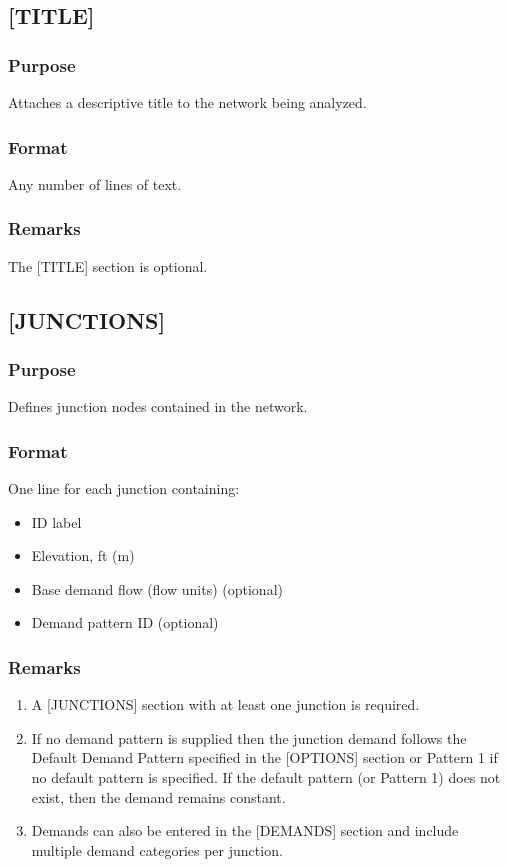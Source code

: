 \subsection{[TITLE]}
  \subsubsection{Purpose}
  Attaches a descriptive title to the network being analyzed.
  \subsubsection{Format}
  Any number of lines of text.
  \subsubsection{Remarks}
  The [TITLE] section is optional.
\subsection{[JUNCTIONS]}
  \subsubsection{Purpose}
  Defines junction nodes contained in the network.
  \subsubsection{Format}
  One line for each junction containing:
  \begin{itemize}
    \item ID label
    \item Elevation, ft (m)
    \item Base demand flow (flow units) (optional)
    \item Demand pattern ID (optional)
  \end{itemize}
  \subsubsection{Remarks}
  \begin{enumerate}
    \item A [JUNCTIONS] section with at least one junction is required.
    \item If no demand pattern is supplied then the junction demand follows the 
          Default Demand Pattern specified in the [OPTIONS] section or Pattern 1 
	  if no default pattern is specified. If the default pattern (or Pattern 1) 
	  does not exist, then the demand remains constant.
    \item Demands can also be entered in the [DEMANDS] section and include multiple
           demand categories per junction.
  \end{enumerate}
